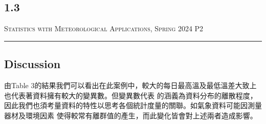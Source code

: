 \documentclass{article}
\begin{document}
\begin{CJK*}{UTF8}{bsmi}
\section*{1.3}
\renewcommand{\arraystretch}{1.5} 
    \begin{table}[htbp]
        \centering
            \caption{Mean DTR and variance(Based on hourly data).}
    \end{table}
    \renewcommand{\arraystretch}{1.0} 

    \newpage

\thispagestyle{empty}
\hfill {\scshape \large Statistics with Meteorological Applications, Spring 2024} \hfill {\scshape P2}
\smallskip
\hrule
\bigskip
\bigskip
\bigskip

\subsection*{Discussion}
\begin{spacing}{2}
    \begin{large}
        由Table 3的結果我們可以看出在此案例中，較大的每日最高溫及最低溫差大致上也代表著資料擁有較大的變異數。但變異數代表
        的涵義為資料分布的離散程度，因此我們也須考量資料的特性以思考各個統計度量的關聯。如氣象資料可能因測量器材及環境因素
        使得較常有離群值的產生，而此變化皆會對上述兩者造成影響。
    \end{large}
\end{spacing}




\end{CJK*}
\end{document}
